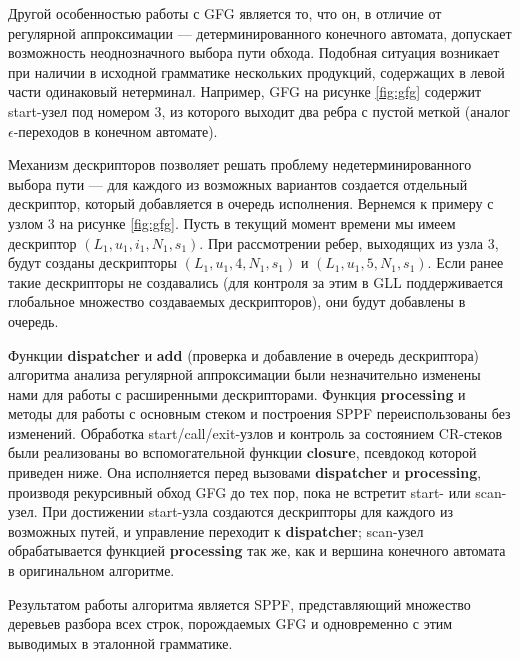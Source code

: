 Другой особенностью работы с GFG является то, что он, в отличие от регулярной аппроксимации --- детерминированного конечного автомата, допускает возможность неоднозначного выбора пути обхода. 
Подобная ситуация возникает при наличии в исходной грамматике нескольких продукций, содержащих в левой части одинаковый нетерминал. 
Например, GFG на рисунке \ref{fig:gfg} содержит start-узел под номером 3, из которого выходит два ребра с пустой меткой (аналог $\epsilon$-переходов в конечном автомате).

Механизм дескрипторов позволяет решать проблему недетерминированного выбора пути --- для каждого из возможных вариантов создается отдельный дескриптор, который добавляется в очередь исполнения. 
Вернемся к примеру с узлом 3 на рисунке \ref{fig:gfg}. Пусть в текущий момент времени мы имеем дескриптор $(L_1, u_1, i_1, N_1, s_1)$. 
При рассмотрении ребер, выходящих из узла 3, будут созданы дескрипторы $(L_1, u_1, 4, N_1, s_1)$ и $(L_1, u_1, 5, N_1, s_1)$. Если ранее такие дескрипторы не создавались (для контроля за этим в GLL поддерживается глобальное множество создаваемых дескрипторов), они будут добавлены в очередь.

Функции \textbf{dispatcher} и \textbf{add} (проверка и добавление в очередь дескриптора) алгоритма анализа регулярной аппроксимации были незначительно изменены нами для работы с расширенными дескрипторами. 
Функция \textbf{processing} и методы для работы с основным стеком и построения SPPF переиспользованы без изменений.
Обработка start/call/exit-узлов и контроль за состоянием CR-стеков были реализованы во вспомогательной функции \textbf{closure}, псевдокод которой приведен ниже.
Она исполняется перед вызовами \textbf{dispatcher} и \textbf{processing},  %
производя рекурсивный обход GFG до тех пор, пока не встретит start- или scan-узел. 
При достижении start-узла создаются дескрипторы для каждого из возможных путей, и управление переходит к \textbf{dispatcher};
scan-узел обрабатывается функцией \textbf{processing} так же, как и вершина конечного автомата в оригинальном алгоритме.




Результатом работы алгоритма является SPPF, представляющий множество деревьев разбора всех строк, порождаемых GFG и одновременно с этим выводимых в эталонной грамматике.